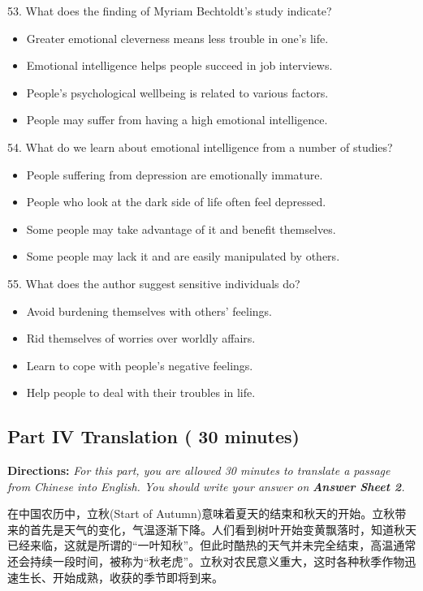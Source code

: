 \documentclass[UTF8,11pt]{ctexart}
\begin{document}
53. What does the finding of Myriam Bechtoldt's study indicate?


\begin{itemize}[leftmargin=2em,itemsep=.2em,topsep=.4em]\item[A.] Greater emotional cleverness means less trouble in one's life.
\item[B.] Emotional intelligence helps people succeed in job interviews.
\item[C.] People's psychological wellbeing is related to various factors.
\item[D.] People may suffer from having a high emotional intelligence.
\end{itemize}

54. What do we learn about emotional intelligence from a number of studies?


\begin{itemize}[leftmargin=2em,itemsep=.2em,topsep=.4em]\item[A.] People suffering from depression are emotionally immature.
\item[B.] People who look at the dark side of life often feel depressed.
\item[C.] Some people may take advantage of it and benefit themselves.
\item[D.] Some people may lack it and are easily manipulated by others.
\end{itemize}

55. What does the author suggest sensitive individuals do?


\begin{itemize}[leftmargin=2em,itemsep=.2em,topsep=.4em]\item[A.] Avoid burdening themselves with others' feelings.
\item[B.] Rid themselves of worries over worldly affairs.
\item[C.] Learn to cope with people's negative feelings.
\item[D.] Help people to deal with their troubles in life.
\end{itemize}

\subsection*{\textbf{Part IV Translation} \textbf{( 30 minutes)}}


\textbf{Directions: }\textit{For this part, you are allowed 30 minutes to translate a passage from Chinese into English. You} \textit{should write your answer on }\textbf{\textit{Answer Sheet 2}}\textit{.}


在中国农历中，立秋(Start of Autumn)意味着夏天的结束和秋天的开始。立秋带来的首先是天气的变化，气温逐渐下降。人们看到树叶开始变黄飘落时，知道秋天已经来临，这就是所谓的“一叶知秋”。但此时酷热的天气并未完全结束，高温通常还会持续一段时间，被称为“秋老虎”。立秋对农民意义重大，这时各种秋季作物迅速生长、开始成熟，收获的季节即将到来。
\end{document}
